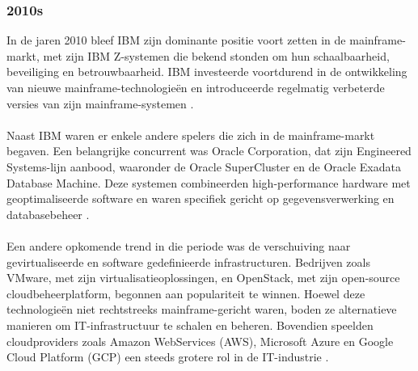 \subsubsection{2010s}
In de jaren 2010 bleef IBM zijn dominante positie voort zetten in de mainframe-markt, met zijn IBM Z-systemen die bekend stonden om hun schaalbaarheid, beveiliging en betrouwbaarheid. IBM investeerde voortdurend in de ontwikkeling van nieuwe mainframe-technologieën en introduceerde regelmatig verbeterde versies van zijn mainframe-systemen \autocite{IBM2024d}.
\\ \\
Naast IBM waren er enkele andere spelers die zich in de mainframe-markt begaven. Een belangrijke concurrent was Oracle Corporation, dat zijn Engineered Systems-lijn aanbood, waaronder de Oracle SuperCluster en de Oracle Exadata Database Machine. Deze systemen combineerden high-performance hardware met geoptimaliseerde software en waren specifiek gericht op gegevensverwerking en databasebeheer \autocite{Oracle}.
\\ \\
Een andere opkomende trend in die periode was de verschuiving naar gevirtualiseerde en software gedefinieerde infrastructuren. Bedrijven zoals VMware, met zijn virtualisatieoplossingen, en OpenStack, met zijn open-source cloudbeheerplatform, begonnen aan populariteit te winnen. Hoewel deze technologieën niet rechtstreeks mainframe-gericht waren, boden ze alternatieve manieren om IT-infrastructuur te schalen en beheren. Bovendien speelden cloudproviders zoals Amazon WebServices (AWS), Microsoft Azure en Google Cloud Platform (GCP) een steeds grotere rol in de IT-industrie \autocite{Google} \autocite{AWS} \autocite{VMWare}.
\\ \\
